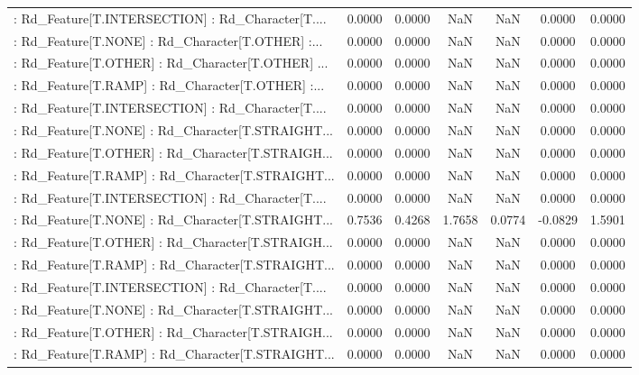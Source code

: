 \begin{longtable}{p{4cm}cccccc}
 : Rd\_Feature[T.INTERSECTION] : Rd\_Character[T.... &  0.0000 &    0.0000 &     NaN &          NaN &  0.0000 &  0.0000 \\
 : Rd\_Feature[T.NONE] : Rd\_Character[T.OTHER] :... &  0.0000 &    0.0000 &     NaN &          NaN &  0.0000 &  0.0000 \\
 : Rd\_Feature[T.OTHER] : Rd\_Character[T.OTHER] ... &  0.0000 &    0.0000 &     NaN &          NaN &  0.0000 &  0.0000 \\
 : Rd\_Feature[T.RAMP] : Rd\_Character[T.OTHER] :... &  0.0000 &    0.0000 &     NaN &          NaN &  0.0000 &  0.0000 \\
 : Rd\_Feature[T.INTERSECTION] : Rd\_Character[T.... &  0.0000 &    0.0000 &     NaN &          NaN &  0.0000 &  0.0000 \\
 : Rd\_Feature[T.NONE] : Rd\_Character[T.STRAIGHT... &  0.0000 &    0.0000 &     NaN &          NaN &  0.0000 &  0.0000 \\
 : Rd\_Feature[T.OTHER] : Rd\_Character[T.STRAIGH... &  0.0000 &    0.0000 &     NaN &          NaN &  0.0000 &  0.0000 \\
 : Rd\_Feature[T.RAMP] : Rd\_Character[T.STRAIGHT... &  0.0000 &    0.0000 &     NaN &          NaN &  0.0000 &  0.0000 \\
 : Rd\_Feature[T.INTERSECTION] : Rd\_Character[T.... &  0.0000 &    0.0000 &     NaN &          NaN &  0.0000 &  0.0000 \\
 : Rd\_Feature[T.NONE] : Rd\_Character[T.STRAIGHT... &  0.7536 &    0.4268 &  1.7658 &       0.0774 & -0.0829 &  1.5901 \\
 : Rd\_Feature[T.OTHER] : Rd\_Character[T.STRAIGH... &  0.0000 &    0.0000 &     NaN &          NaN &  0.0000 &  0.0000 \\
 : Rd\_Feature[T.RAMP] : Rd\_Character[T.STRAIGHT... &  0.0000 &    0.0000 &     NaN &          NaN &  0.0000 &  0.0000 \\
 : Rd\_Feature[T.INTERSECTION] : Rd\_Character[T.... &  0.0000 &    0.0000 &     NaN &          NaN &  0.0000 &  0.0000 \\
 : Rd\_Feature[T.NONE] : Rd\_Character[T.STRAIGHT... &  0.0000 &    0.0000 &     NaN &          NaN &  0.0000 &  0.0000 \\
 : Rd\_Feature[T.OTHER] : Rd\_Character[T.STRAIGH... &  0.0000 &    0.0000 &     NaN &          NaN &  0.0000 &  0.0000 \\
 : Rd\_Feature[T.RAMP] : Rd\_Character[T.STRAIGHT... &  0.0000 &    0.0000 &     NaN &          NaN &  0.0000 &  0.0000 \\

\end{longtable}
